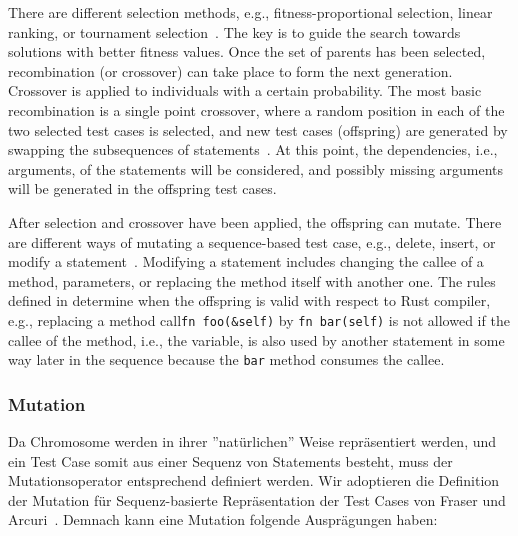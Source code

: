 \documentclass{article}
\begin{document}
There are different selection methods, e.g., fitness-proportional selection, linear ranking, or tournament selection~\cite{McMinn_2004}. The key is to guide the search towards solutions with better fitness values. Once the set of parents has been selected, recombination (or crossover) can take place to form the next generation. Crossover is applied to individuals with a certain probability. The most basic recombination is a single point crossover, where a random position in each of the two selected test cases is selected, and new test cases (offspring) are generated by swapping the subsequences of statements~\cite{Fraser2012}. At this point, the dependencies, i.e., arguments, of the statements will be considered, and possibly missing arguments will be generated in the offspring test cases.

After selection and crossover have been applied, the offspring can mutate. There are different ways of mutating a sequence-based test case, e.g., delete, insert, or modify a statement~\cite{Fraser2012}. Modifying a statement includes changing the callee of a method, parameters, or replacing the method itself with another one. The rules defined in  determine when the offspring is valid with respect to Rust compiler, e.g., replacing a method call\lstinline{fn foo(&self)} by \lstinline{fn bar(self)} is not allowed if the callee of the method, i.e., the variable, is also used by another statement in some way later in the sequence because the \lstinline{bar} method consumes the callee.

\subsubsection{Mutation}
Da Chromosome werden in ihrer ''natürlichen'' Weise repräsentiert werden, und ein Test Case somit aus einer Sequenz von Statements besteht, muss der Mutationsoperator entsprechend definiert werden. Wir adoptieren die Definition der Mutation für Sequenz-basierte Repräsentation der Test Cases von Fraser und Arcuri~\cite{Fraser2012}. Demnach kann eine Mutation folgende Ausprägungen haben:
\end{document}
